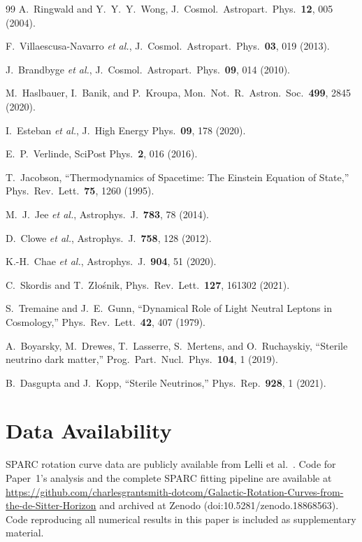\documentclass[aps,prd,twocolumn,superscriptaddress,nofootinbib]{revtex4-2}
\begin{document}
\begin{thebibliography}{99}
 A.~Ringwald and Y.~Y.~Y.~Wong, J.\ Cosmol.\ Astropart.\ Phys.\ \textbf{12}, 005 (2004).

 F.~Villaescusa-Navarro \emph{et al.}, J.\ Cosmol.\ Astropart.\ Phys.\ \textbf{03}, 019 (2013).

 J.~Brandbyge \emph{et al.}, J.\ Cosmol.\ Astropart.\ Phys.\ \textbf{09}, 014 (2010).

 M.~Haslbauer, I.~Banik, and P.~Kroupa, Mon.\ Not.\ R.\ Astron.\ Soc.\ \textbf{499}, 2845 (2020).

 I.~Esteban \emph{et al.}, J.\ High Energy Phys.\ \textbf{09}, 178 (2020).

 E.~P.~Verlinde, SciPost Phys.\ \textbf{2}, 016 (2016).

 T.~Jacobson, ``Thermodynamics of Spacetime: The Einstein Equation of State,'' Phys.\ Rev.\ Lett.\ \textbf{75}, 1260 (1995).

 M.~J.~Jee \emph{et al.}, Astrophys.\ J.\ \textbf{783}, 78 (2014).

 D.~Clowe \emph{et al.}, Astrophys.\ J.\ \textbf{758}, 128 (2012).

 K.-H.~Chae \emph{et al.}, Astrophys.\ J.\ \textbf{904}, 51 (2020).

 C.~Skordis and T.~Z\l{}o\'snik, Phys.\ Rev.\ Lett.\ \textbf{127}, 161302 (2021).

 S.~Tremaine and J.~E.~Gunn, ``Dynamical Role of Light Neutral Leptons in Cosmology,'' Phys.\ Rev.\ Lett.\ \textbf{42}, 407 (1979).

 A.~Boyarsky, M.~Drewes, T.~Lasserre, S.~Mertens, and O.~Ruchayskiy, ``Sterile neutrino dark matter,'' Prog.\ Part.\ Nucl.\ Phys.\ \textbf{104}, 1 (2019).

 B.~Dasgupta and J.~Kopp, ``Sterile Neutrinos,'' Phys.\ Rep.\ \textbf{928}, 1 (2021).

\end{thebibliography}

\appendix

\section*{Data Availability}

SPARC rotation curve data are publicly available from Lelli et al.~\cite{Lelli2016}. Code for Paper~1's analysis and the complete SPARC fitting pipeline are available at \url{https://github.com/charlesgrantsmith-dotcom/Galactic-Rotation-Curves-from-the-de-Sitter-Horizon} and archived at Zenodo (doi:10.5281/zenodo.18868563). Code reproducing all numerical results in this paper is included as supplementary material.
\end{document}
